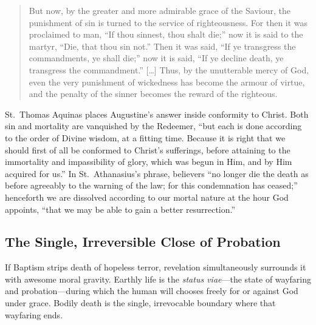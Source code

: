 \begin{quote}
But now, by the greater and more admirable grace of the Saviour, the punishment of sin is turned to the service of righteousness. For then it was proclaimed to man, ``If thou sinnest, thou shalt die;'' now it is said to the martyr, ``Die, that thou sin not.'' Then it was said, ``If ye transgress the commandments, ye shall die;'' now it is said, ``If ye decline death, ye transgress the commandment.'' [\ldots] Thus, by the unutterable mercy of God, even the very punishment of wickedness has become the armour of virtue, and the penalty of the sinner becomes the reward of the righteous.
\end{quote}

St.~Thomas Aquinas places Augustine's answer inside conformity to Christ. Both sin and mortality are vanquished by the Redeemer, ``but each is done according to the order of Divine wisdom, at a fitting time. Because it is right that we should first of all be conformed to Christ's sufferings, before attaining to the immortality and impassibility of glory, which was begun in Him, and by Him acquired for us.'' In St.~Athanasius's phrase, believers ``no longer die the death as before agreeably to the warning of the law; for this condemnation has ceased;'' henceforth we are dissolved according to our mortal nature at the hour God appoints, ``that we may be able to gain a better resurrection.''

\subsection{The Single, Irreversible Close of Probation}

If Baptism strips death of hopeless terror, revelation simultaneously surrounds it with awesome moral gravity. Earthly life is the \emph{status viae}---the state of wayfaring and probation---during which the human will chooses freely for or against God under grace. Bodily death is the single, irrevocable boundary where that wayfaring ends.

